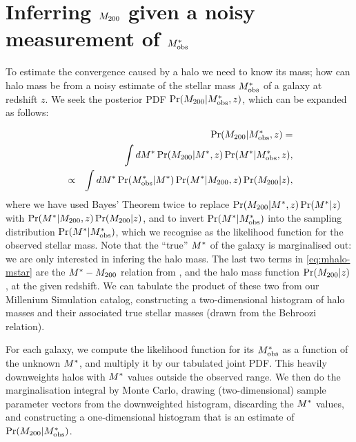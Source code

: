 \documentclass[useAMS,usenatbib]{mn2e}
\begin{document}

\appendix


\section{Inferring $M_{200}$ given a noisy measurement of $M^{*}_{\rm obs}$}
\label{appendix:MSMH}

To estimate the convergence caused by a halo we need to know its mass; how can 
halo mass be \infered from a noisy estimate of the stellar mass $M^{*}_{\rm obs}$
of a galaxy at redshift $z$. We seek the posterior
PDF $\Pr(M_{200}|M^{*}_{\rm obs},z)$, which can be expanded as follows:

\begin{eqnarray}
&& \Pr(M_{200}|M^{*}_{\rm obs},z) = \notag\\
&& \int dM^{*} \Pr(M_{200}|M^{*},z) \Pr(M^{*}|M^{*}_{\rm obs},z), \notag\\
&\propto& \int dM^{*} \Pr(M^{*}_{\rm obs}|M^{*}) \Pr(M^{*}|M_{200},z) \Pr(M_{200}|z),
\label{eq:mhalo-mstar}
\end{eqnarray}
where we have used Bayes' Theorem twice to replace
$\Pr(M_{200}|M^{*},z) \Pr(M^{*}|z)$ with 
$\Pr(M^{*}|M_{200},z) \Pr(M_{200}|z)$, and 
to invert $\Pr(M^{*}|M^{*}_{\rm obs})$ into the sampling
distribution $\Pr(M^{*}|M^{*}_{\rm obs})$, which we recognise as the likelihood
function for the observed stellar mass. Note that the ``true'' $M^{*}$ of the
galaxy is marginalised out: we are only interested in infering the halo
mass. The last two terms in
\eqref{eq:mhalo-mstar} are the $M^{*}-M_{200}$ relation from
\citet{BehrooziEtal2010}, and the halo mass function $\Pr(M_{200}|z)$, at the
given redshift. We can
tabulate the product of these two from our Millenium Simulation catalog,
constructing a two-dimensional histogram of halo masses and their associated
true stellar masses (drawn from the Behroozi relation). 

For each galaxy, we compute the likelihood function for its $M^{*}_{\rm obs}$ as a
function of the unknown $M^{*}$, and multiply it by our tabulated joint PDF.
This heavily downweights halos with $M^{*}$ values outside the observed
range. We then do the marginalisation integral by Monte Carlo, drawing
(two-dimensional) sample parameter vectors
from the downweighted histogram, discarding the $M^{*}$ values, and
constructing a one-dimensional histogram that is an estimate of
$\Pr(M_{200}|M^{*}_{\rm obs})$.
\end{document}
